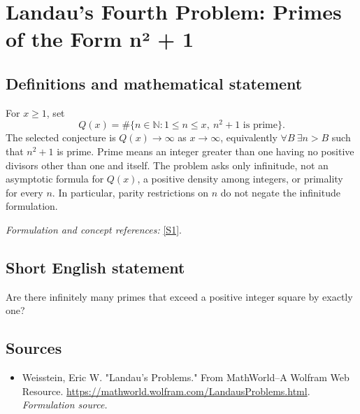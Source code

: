 \documentclass[11pt]{article}
\begin{document}
\section*{\texorpdfstring{Landau's Fourth Problem: Primes of the Form n² + 1}{Landau's Fourth Problem: Primes of the Form n² + 1}}\label{statement}
\subsection{Definitions and mathematical statement}
For $x\ge1$, set
\[
 Q(x)=\#\{n\in{\mathbb{N}}:1\le n\le x,\ n^2+1\text{ is prime}\}.
\]
The selected conjecture is $Q(x)\to\infty$ as $x\to\infty$, equivalently
$\forall B\ \exists n>B$ such that $n^2+1$ is prime. Prime means an integer greater than one having no positive divisors other than one and itself. The problem asks only infinitude, not an asymptotic formula for $Q(x)$, a positive density among integers, or primality for every $n$. In particular, parity restrictions on $n$ do not negate the infinitude formulation.
\par\smallskip\textit{Formulation and concept references:} \href{https://mathworld.wolfram.com/LandausProblems.html}{[S1]}.

\subsection{Short English statement}
Are there infinitely many primes that exceed a positive integer square by exactly one?
\subsection{Sources}
\begin{itemize}
\item[S1]Weisstein, Eric W. "Landau's Problems." From MathWorld--A Wolfram Web Resource.
\url{https://mathworld.wolfram.com/LandausProblems.html}.
\textit{Formulation source.}
\end{itemize}
\end{document}
